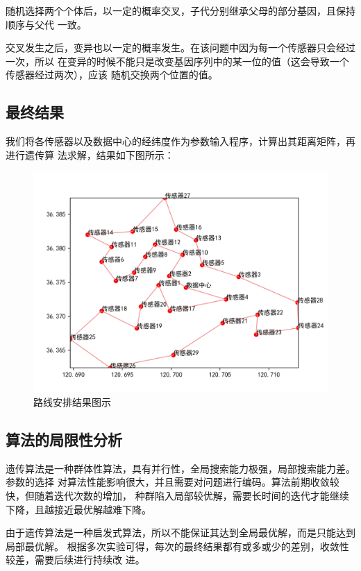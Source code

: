 \documentclass{ctexart}
\begin{document}
    随机选择两个个体后，以一定的概率交叉，子代分别继承父母的部分基因，且保持顺序与父代
    一致。

    交叉发生之后，变异也以一定的概率发生。在该问题中因为每一个传感器只会经过一次，所以
    在变异的时候不能只是改变基因序列中的某一位的值（这会导致一个传感器经过两次），应该
    随机交换两个位置的值。

    \subsection{最终结果}
    我们将各传感器以及数据中心的经纬度作为参数输入程序，计算出其距离矩阵，再进行遗传算
    法求解，结果如下图所示：
    \begin{figure}[H]
        \centering
        \includegraphics[width=1\textwidth]{figure/path.png}
        \caption {路线安排结果图示}
    \end{figure}

    \subsection{算法的局限性分析}
    遗传算法是一种群体性算法，具有并行性，全局搜索能力极强，局部搜索能力差。参数的选择
    对算法性能影响很大，并且需要对问题进行编码。算法前期收敛较快，但随着迭代次数的增加，
    种群陷入局部较优解，需要长时间的迭代才能继续下降，且越接近最优解越难下降。

    由于遗传算法是一种启发式算法，所以不能保证其达到全局最优解，而是只能达到局部最优解。
    根据多次实验可得，每次的最终结果都有或多或少的差别，收敛性较差，需要后续进行持续改
    进。
\end{document}
